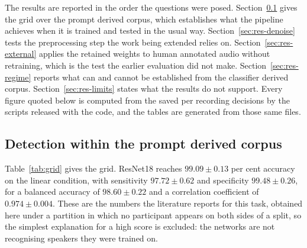 \documentclass[pdflatex,sn-mathphys-num]{sn-jnl}
\begin{document}
The results are reported in the order the questions were posed.
Section~\ref{sec:res-grid} gives the grid over the prompt derived corpus, which establishes
what the pipeline achieves when it is trained and tested in the usual way.
Section~\ref{sec:res-denoise} tests the preprocessing step the work being extended relies
on. Section~\ref{sec:res-external} applies the retained weights to human annotated audio
without retraining, which is the test the earlier evaluation did not make.
Section~\ref{sec:res-regime} reports what can and cannot be established from the
classifier derived corpus. Section~\ref{sec:res-limits} states what the results do not
support. Every figure quoted below is computed from the saved per recording decisions by
the scripts released with the code, and the tables are generated from those same files.

\subsection{Detection within the prompt derived corpus}\label{sec:res-grid}

Table~\ref{tab:grid} gives the grid. ResNet18 reaches $99.09 \pm 0.13$ per cent accuracy
on the linear condition, with sensitivity $97.72 \pm 0.62$ and specificity
$99.48 \pm 0.26$, for a balanced accuracy of $98.60 \pm 0.22$ and a correlation
coefficient of $0.974 \pm 0.004$. These are the numbers the literature reports for this
task, obtained here under a partition in which no participant appears on both sides of a
split, so the simplest explanation for a high score is excluded: the networks are not
recognising speakers they were trained on.
\end{document}
